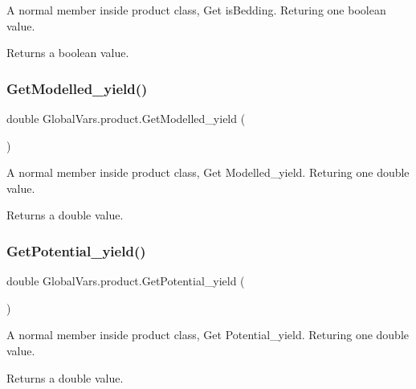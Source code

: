 A normal member inside product class, Get is\+Bedding. Returing one boolean value. 

\begin{DoxyReturn}{Returns}
a boolean value. 
\end{DoxyReturn}
\mbox{\label{class_global_vars_1_1product_a03a183a7d8aaf4c69ebb1da4b6519ce2}} 
\subsubsection{\texorpdfstring{GetModelled\_yield()}{GetModelled\_yield()}}
{\footnotesize\ttfamily double Global\+Vars.\+product.\+Get\+Modelled\+\_\+yield (\begin{DoxyParamCaption}{ }\end{DoxyParamCaption})\hspace{0.3cm}{\ttfamily [inline]}}



A normal member inside product class, Get Modelled\+\_\+yield. Returing one double value. 

\begin{DoxyReturn}{Returns}
a double value. 
\end{DoxyReturn}
\mbox{\label{class_global_vars_1_1product_af36d802050e8d54552fe27e50c23fdf2}} 
\subsubsection{\texorpdfstring{GetPotential\_yield()}{GetPotential\_yield()}}
{\footnotesize\ttfamily double Global\+Vars.\+product.\+Get\+Potential\+\_\+yield (\begin{DoxyParamCaption}{ }\end{DoxyParamCaption})\hspace{0.3cm}{\ttfamily [inline]}}



A normal member inside product class, Get Potential\+\_\+yield. Returing one double value. 

\begin{DoxyReturn}{Returns}
a double value. 
\end{DoxyReturn}
\mbox{\label{class_global_vars_1_1product_afc503db364ad2560853f82273ff428f5}} 

